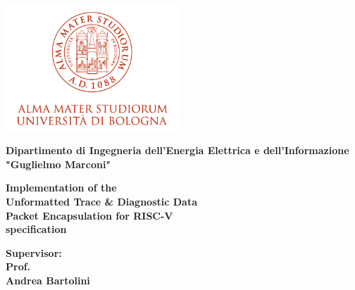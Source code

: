 \documentclass[12pt,a4paper,twoside]{book}
\begin{document}
\pagestyle{empty}

\begin{titlepage}

\begin{center}

\includegraphics[width=6.5cm,height=4.7cm]{img/marchio-di-ateneo.png}

\vspace{10mm}

{\large{\bf{Dipartimento di Ingegneria dell'Energia Elettrica e dell'Informazione "Guglielmo Marconi"}}} 

\vspace{5mm}


\vspace{15mm}

{\Huge{\bf Implementation of the }}\\
\vspace{3mm}
{\Huge{\bf Unformatted Trace \& Diagnostic Data}}\\
\vspace{3mm}
{\Huge{\bf Packet Encapsulation for RISC-V}}\\
\vspace{3mm}
{\Huge{\bf  specification}}\\
\vspace{3mm}

\end{center}

\vspace{20mm}

\begin{minipage}[t]{0.40\textwidth}
{\Large{\bf Supervisor: \\ Prof.\\ Andrea Bartolini}}

\vspace{3mm}


\end{minipage}
\end{titlepage}
\end{document}
